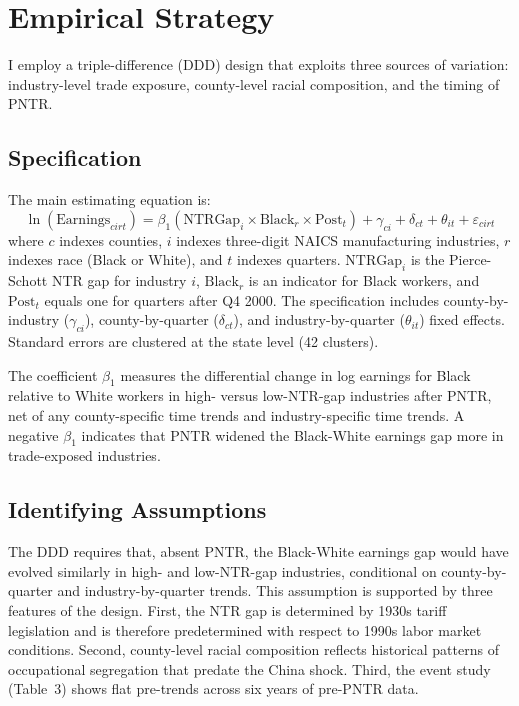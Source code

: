 \documentclass[12pt]{article}
\begin{document}


\section{Empirical Strategy}

I employ a triple-difference (DDD) design that exploits three sources of variation: industry-level trade exposure, county-level racial composition, and the timing of PNTR.

\subsection{Specification}

The main estimating equation is:
\begin{equation}
\ln(\text{Earnings}_{cirt}) = \beta_1 (\text{NTRGap}_i \times \text{Black}_r \times \text{Post}_t) + \gamma_{ci} + \delta_{ct} + \theta_{it} + \varepsilon_{cirt}
\label{eq:ddd}
\end{equation}
where $c$ indexes counties, $i$ indexes three-digit NAICS manufacturing industries, $r$ indexes race (Black or White), and $t$ indexes quarters. $\text{NTRGap}_i$ is the Pierce-Schott NTR gap for industry $i$, $\text{Black}_r$ is an indicator for Black workers, and $\text{Post}_t$ equals one for quarters after Q4 2000. The specification includes county-by-industry ($\gamma_{ci}$), county-by-quarter ($\delta_{ct}$), and industry-by-quarter ($\theta_{it}$) fixed effects. Standard errors are clustered at the state level (42 clusters).

The coefficient $\beta_1$ measures the differential change in log earnings for Black relative to White workers in high- versus low-NTR-gap industries after PNTR, net of any county-specific time trends and industry-specific time trends. A negative $\beta_1$ indicates that PNTR widened the Black-White earnings gap more in trade-exposed industries.

\subsection{Identifying Assumptions}

The DDD requires that, absent PNTR, the Black-White earnings gap would have evolved similarly in high- and low-NTR-gap industries, conditional on county-by-quarter and industry-by-quarter trends. This assumption is supported by three features of the design. First, the NTR gap is determined by 1930s tariff legislation and is therefore predetermined with respect to 1990s labor market conditions. Second, county-level racial composition reflects historical patterns of occupational segregation that predate the China shock. Third, the event study (Table~3) shows flat pre-trends across six years of pre-PNTR data.
\end{document}
